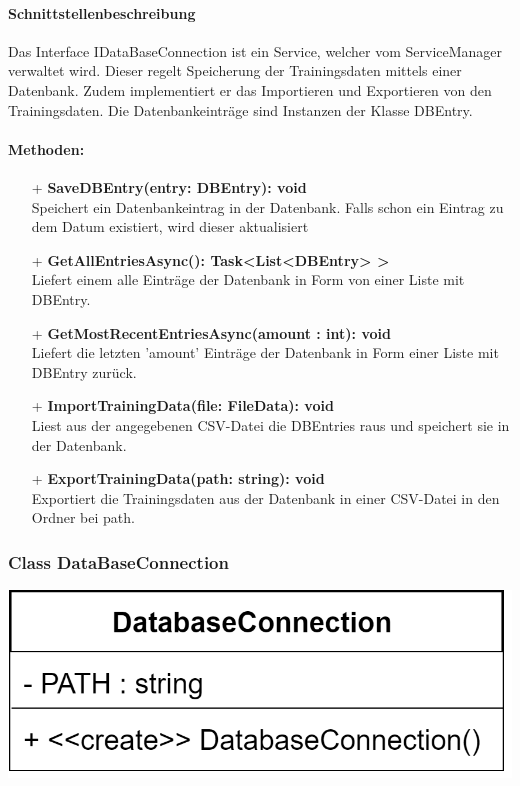\documentclass[a4paper,12pt]{article}
\begin{document}
	\paragraph{Schnittstellenbeschreibung}
	Das Interface IDataBaseConnection ist ein Service, welcher vom ServiceManager verwaltet wird. Dieser regelt Speicherung der Trainingsdaten mittels einer \gls{Datenbank}. Zudem implementiert er das Importieren und Exportieren von den Trainingsdaten.
	Die Datenbankeinträge sind Instanzen der Klasse DBEntry. 
	
	\paragraph{Methoden:}
	\begin{itemize}
		\item[+] \textbf{SaveDBEntry(entry: DBEntry): void}\\Speichert ein Datenbankeintrag in der \gls{Datenbank}. Falls schon ein Eintrag zu dem Datum existiert, wird dieser aktualisiert\\

		\item[+] \textbf{GetAllEntriesAsync(): Task<List<DBEntry> >}\\Liefert einem alle Einträge der Datenbank in Form von einer Liste mit DBEntry.\\ 
		\item[+] \textbf{GetMostRecentEntriesAsync(amount : int): void}\\Liefert  die letzten 'amount' Einträge der Datenbank in Form einer Liste mit DBEntry zurück.\\
		\item[+] \textbf{ImportTrainingData(file: FileData): void}\\Liest aus der angegebenen \gls{CSV}-Datei die DBEntries raus und speichert sie in der \gls{Datenbank}.\\
		\item[+] \textbf{ExportTrainingData(path: string): void}\\Exportiert die Trainingsdaten aus der \gls{Datenbank} in einer \gls{CSV}-Datei in den Ordner bei path. \\
	\end{itemize}
\begin{minipage}[b]{0.6\textwidth}
	\subsubsection{Class DataBaseConnection}
\end{minipage}
\begin{minipage}[c]{0.5\textwidth}
	\includegraphics{bilder/EMKlassen/DataBaseConnectionClass.png}
\end{minipage}
\end{document}
